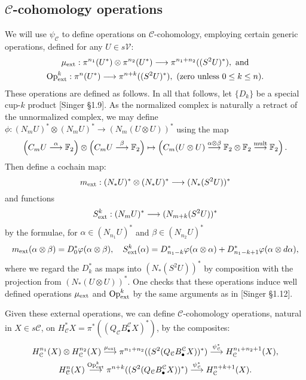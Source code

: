 \documentclass[11pt]{amsart}
\theoremstyle{plain}
\theoremstyle{definition}
\let\oldphi\phi
\let\phi\varphi
\renewcommand{\to}{\longrightarrow}
\newcommand{\calC}{\mathcal{C}}
\newcommand{\calV}{\mathcal{V}}
\theoremstyle{plain}
\newcommand{\ExtCohOp}{\textup{Op}_\textup{ext}}
\newcommand{\ExtCohProd}{\mu_\textup{ext}}
\newcommand{\F}{\mathbb{F}}
\begin{document}
\begin{Conventions and notation}
\subsection{$\calC$-cohomology operations}\label{generic coh ops section}
We will use $\psi_\calC$ to define operations on $\calC$-cohomology, employing certain generic operations, defined for any $U\in s\calV$:
\begin{gather*}
\ExtCohProd:\pi^{n_1}(U^*)\otimes \pi^{n_2}(U^*)\to \pi^{n_1+n_2}((S^2U)^*),\textup{ and}\\
\ExtCohOp^k:\pi^{n}(U^*)\to \pi^{n+k}((S^2U)^*),\textup{ (zero unless $0\leq k\leq n$).}
\end{gather*}
These operations are defined as follows. In all that follows, let $\{D_k\}$ be a special cup-$k$ product [Singer \S1.9]. As the normalized complex is naturally a retract of the unnormalized complex, we may define $\oldphi:\left(N_mU\right)^*\otimes \left(N_mU\right)^*\to \left(N_m(U\otimes U)\right)^*$ using the map
\[\left(C_mU\overset{\alpha}{\to}\F_2\right)\otimes \left(C_mU\overset{\beta}{\to}\F_2\right)\mapsto\left(C_m(U\otimes U)\overset{\alpha\otimes\beta}{\to}\F_2\otimes \F_2\overset{\textup{mult}}{\to}\F_2\right).\]
Then define a cochain map:
\[m_\textup{ext}:(N_*U)^*\otimes (N_*U)^*\to (N_*(S^2U))^*\]
and functions
\[S^k_\textup{ext}:(N_mU)^*\to (N_{m+k}(S^2U))^*\]
by the formulae, for $\alpha\in (N_{n_1}U)^*$ and $\beta\in (N_{n_2}U)^*$
\[m_\textup{ext}(\alpha\otimes\beta)=D_0^*\oldphi(\alpha\otimes\beta),\quad S^k_\textup{ext}(\alpha)=D^*_{n_1-k}\oldphi(\alpha\otimes \alpha)+D^*_{n_1-k+1}\oldphi(\alpha\otimes d\alpha),\]
where we regard the $D^*_k$ as maps into $(N_*(S^2U))^*$ by composition with the projection from $(N_*(U\otimes U))^*$. One checks that these operations induce well defined operations $\ExtCohProd$ and $\ExtCohOp^k$ by the same arguments as in [Singer \S1.12].

Given these external operations, we can define $\calC$-cohomology operations, natural in $X\in s\calC$, on $H^*_\calC X=\pi^*((Q_\calC B_\bullet^\calC X)^*)$, by the composites:
\begin{gather*}
H_\calC^{n_1}(X)\otimes H_\calC^{n_2}(X)\overset{\ExtCohProd}{\to} \pi^{n_1+n_2}((S^2(Q_\calC B_\bullet^\calC X))^*)\overset{\psi_\calC^*}{\to} H_\calC^{n_1+n_2+1}(X),\\
H_\calC^{n}(X)\overset{\ExtCohOp^k}{\to} \pi^{n+k}((S^2(Q_\calC B_\bullet^\calC X))^*)\overset{\psi_\calC^*}{\to} H_\calC^{n+k+1}(X).
\end{gather*}

\end{Conventions and notation}
\end{document}
